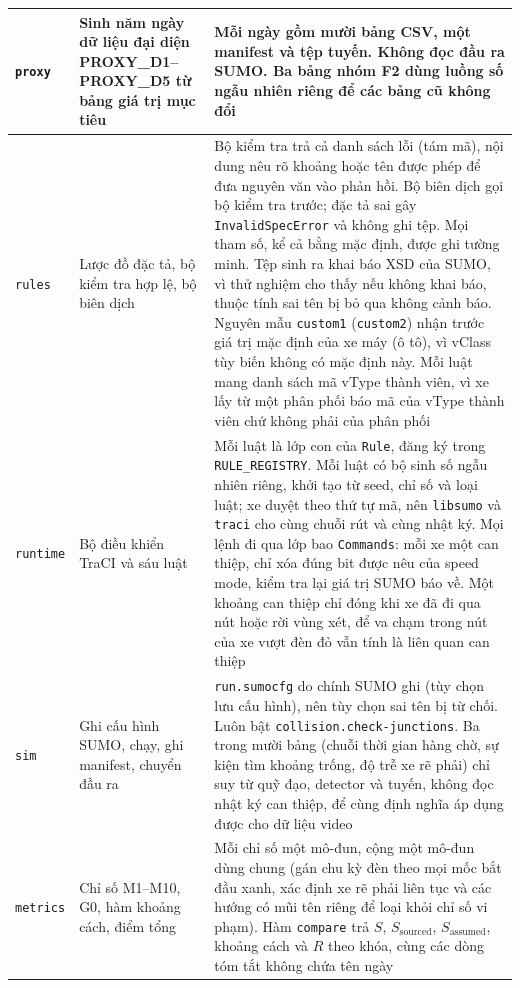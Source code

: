 \documentclass[../main.tex]{subfiles}
\begin{document}
\begin{longtable}{|p{2.3cm}|p{4.2cm}|p{7.5cm}|}
\texttt{proxy} & Sinh năm ngày dữ liệu đại diện PROXY\_D1--PROXY\_D5 từ bảng giá trị mục tiêu & Mỗi ngày gồm mười bảng CSV, một manifest và tệp tuyến. Không đọc đầu ra SUMO. Ba bảng nhóm F2 dùng luồng số ngẫu nhiên riêng để các bảng cũ không đổi \\ \hline
\texttt{rules} & Lược đồ đặc tả, bộ kiểm tra hợp lệ, bộ biên dịch & Bộ kiểm tra trả cả danh sách lỗi (tám mã), nội dung nêu rõ khoảng hoặc tên được phép để đưa nguyên văn vào phản hồi. Bộ biên dịch gọi bộ kiểm tra trước; đặc tả sai gây \texttt{InvalidSpecError} và không ghi tệp. Mọi tham số, kể cả bằng mặc định, được ghi tường minh. Tệp sinh ra khai báo XSD của SUMO, vì thử nghiệm cho thấy nếu không khai báo, thuộc tính sai tên bị bỏ qua không cảnh báo. Nguyên mẫu \texttt{custom1} (\texttt{custom2}) nhận trước giá trị mặc định của xe máy (ô tô), vì vClass tùy biến không có mặc định này. Mỗi luật mang danh sách mã vType thành viên, vì xe lấy từ một phân phối báo mã của vType thành viên chứ không phải của phân phối \\ \hline
\texttt{runtime} & Bộ điều khiển TraCI và sáu luật & Mỗi luật là lớp con của \texttt{Rule}, đăng ký trong \texttt{RULE\_REGISTRY}. Mỗi luật có bộ sinh số ngẫu nhiên riêng, khởi tạo từ seed, chỉ số và loại luật; xe duyệt theo thứ tự mã, nên \texttt{libsumo} và \texttt{traci} cho cùng chuỗi rút và cùng nhật ký. Mọi lệnh đi qua lớp bao \texttt{Commands}: mỗi xe một can thiệp, chỉ xóa đúng bit được nêu của speed mode, kiểm tra lại giá trị SUMO báo về. Một khoảng can thiệp chỉ đóng khi xe đã đi qua nút hoặc rời vùng xét, để va chạm trong nút của xe vượt đèn đỏ vẫn tính là liên quan can thiệp \\ \hline
\texttt{sim} & Ghi cấu hình SUMO, chạy, ghi manifest, chuyển đầu ra & \texttt{run.sumocfg} do chính SUMO ghi (tùy chọn lưu cấu hình), nên tùy chọn sai tên bị từ chối. Luôn bật \texttt{collision.check-junctions}. Ba trong mười bảng (chuỗi thời gian hàng chờ, sự kiện tìm khoảng trống, độ trễ xe rẽ phải) chỉ suy từ quỹ đạo, detector và tuyến, không đọc nhật ký can thiệp, để cùng định nghĩa áp dụng được cho dữ liệu video \\ \hline
\texttt{metrics} & Chỉ số M1--M10, G0, hàm khoảng cách, điểm tổng & Mỗi chỉ số một mô-đun, cộng một mô-đun dùng chung (gán chu kỳ đèn theo mọi mốc bắt đầu xanh, xác định xe rẽ phải liên tục và các hướng có mũi tên riêng để loại khỏi chỉ số vi phạm). Hàm \texttt{compare} trả $S$, $S_{\text{sourced}}$, $S_{\text{assumed}}$, khoảng cách và $R$ theo khóa, cùng các dòng tóm tắt không chứa tên ngày \\ \hline

\end{longtable}
\end{document}
